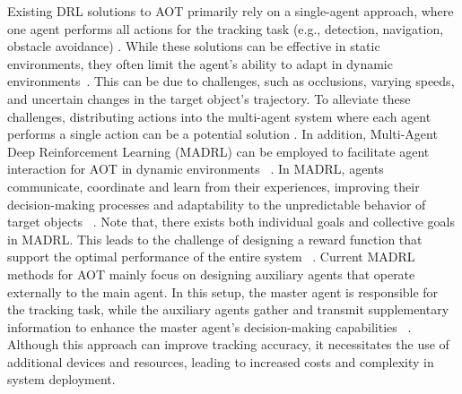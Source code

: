 \documentclass[sigconf]{aamas}
\begin{document}
Existing DRL solutions to AOT primarily rely on a single-agent approach, where one agent performs all actions for the tracking task (e.g., detection, navigation, obstacle avoidance) \cite{jiang2019multi}. While these solutions can be effective in static environments, they often limit the agent's ability to adapt in dynamic environments~\cite{padakandla2021survey}. This can be due to challenges, such as occlusions, varying speeds, and uncertain changes in the target object's trajectory. To alleviate these challenges, distributing actions into the multi-agent system where each agent performs a single action can be a potential solution \cite{jiang2019multi}. In addition, Multi-Agent Deep Reinforcement Learning (MADRL) can be employed to facilitate agent interaction for AOT in dynamic environments ~\cite{padakandla2021survey}. In MADRL, agents communicate, coordinate and learn from their experiences, improving their decision-making processes and adaptability to the unpredictable behavior of target objects ~\cite{Silver2016MasteringTG, Mnih2015HumanlevelCT}. Note that, there exists both individual goals and collective goals in MADRL. This leads to the challenge of designing a reward function that support the optimal performance of the entire system ~\cite{wang2023synergistic}. Current MADRL methods for AOT mainly focus on designing auxiliary agents that operate externally to the main agent. In this setup, the master agent is responsible for the tracking task, while the auxiliary agents gather and transmit supplementary information to enhance the master agent's decision-making capabilities ~\cite{ning2024survey}. Although this approach can improve tracking accuracy, it necessitates the use of additional devices and resources, leading to increased costs and complexity in system deployment. 
\end{document}
